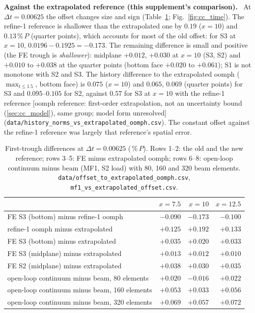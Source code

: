 \documentclass[sn-mathphys,Numbered]{sn-jnl}
\newcommand{\urefFull}{{\small[oomph reference: first-order extrapolation, not an uncertainty bound (\ref{sec:cc_model}), same group; model form unresolved]}}
\newcommand{\pP}{\ensuremath{\,\%\,P}}
\renewcommand{\paragraph}[1]{\par\vspace{0.15\baselineskip}\noindent\textbf{#1}\ }
\begin{document}
\paragraph{Against the extrapolated reference (this supplement's comparison).}
At $\Delta t=0.00625$ the offset changes size and sign (Table~\ref{tab:cc_off}; Fig.~\ref{fig:cc_time}). The refine-1 reference is shallower than the extrapolated one by $0.19$ ($x=10$) and $0.13\,\%\,P$ (quarter points), which accounts for most of the old offset: for S3 at $x=10$, $0.0196-0.1925=-0.173$. The remaining difference is small and positive (the FE trough is \emph{shallower}): midplane $+0.012$, $+0.030$ at $x=10$ (S3, S2) and $+0.010$ to $+0.038$ at the quarter points (bottom face $+0.020$ to $+0.061$); S1 is not monotone with S2 and S3. The history difference to the extrapolated oomph ($\max_{t\le1.5}$, bottom face) is $0.075$ ($x=10$) and $0.065$, $0.069$ (quarter points) for S3 and $0.095$--$0.105$ for S2, against $0.57$ for S3 at $x=10$ with the refine-1 reference \urefFull{} (\texttt{data/history\_norms\_vs\_extrapolated\_oomph.csv}). The constant offset against the refine-1 reference was largely that reference's spatial error.
\begin{table}[!htb]
\centering
\caption{First-trough differences at $\Delta t=0.00625$ (\pP). Rows 1--2: the old and the new reference; rows 3--5: FE minus extrapolated oomph; rows 6--8: open-loop continuum minus beam (MF1, S2 load) with 80, 160 and 320 beam elements. \texttt{data/offset\_to\_extrapolated\_oomph.csv}, \texttt{mf1\_vs\_extrapolated\_offset.csv}.}\label{tab:cc_off}
\small
\begin{tabular}{@{}lrrr@{}}
\toprule
 & $x=7.5$ & $x=10$ & $x=12.5$ \\
\midrule
FE S3 (bottom) minus refine-1 oomph & $-0.090$ & $-0.173$ & $-0.100$ \\
refine-1 oomph minus extrapolated & $+0.125$ & $+0.192$ & $+0.133$ \\
FE S3 (bottom) minus extrapolated & $+0.035$ & $+0.020$ & $+0.033$ \\
FE S3 (midplane) minus extrapolated & $+0.013$ & $+0.012$ & $+0.010$ \\
FE S2 (midplane) minus extrapolated & $+0.038$ & $+0.030$ & $+0.035$ \\
open-loop continuum minus beam, 80 elements & $+0.020$ & $-0.016$ & $+0.022$ \\
open-loop continuum minus beam, 160 elements & $+0.053$ & $+0.033$ & $+0.056$ \\
open-loop continuum minus beam, 320 elements & $+0.069$ & $+0.057$ & $+0.072$ \\
\bottomrule
\end{tabular}
\end{table}
\end{document}
